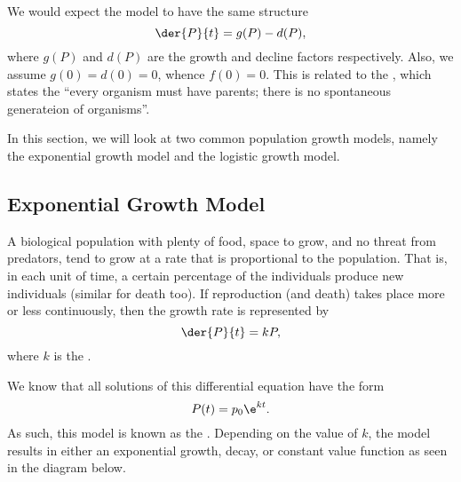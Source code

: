 We would expect the model to have the same structure \[\der{P}{t} = g(P) - d(P),\] where $g(P)$ and $d(P)$ are the growth and decline factors respectively. Also, we assume $g(0) = d(0) = 0$, whence $f(0) = 0$. This is related to the , which states the ``every organism must have parents; there is no spontaneous generateion of organisms''.

In this section, we will look at two common population growth models, namely the exponential growth model and the logistic growth model.

\subsection{Exponential Growth Model}

A biological population with plenty of food, space to grow, and no threat from predators, tend to grow at a rate that is proportional to the population. That is, in each unit of time, a certain percentage of the individuals produce new individuals (similar for death too). If reproduction (and death) takes place more or less continuously, then the growth rate is represented by \[\der{P}{t} = kP,\] where $k$ is the .

We know that all solutions of this differential equation have the form \[P(t) = p_0 \e^{k t}.\] As such, this model is known as the . Depending on the value of $k$, the model results in either an exponential growth, decay, or constant value function as seen in the diagram below.

\begin{figure}[H]
    \centering
    \caption{}
\end{figure}

